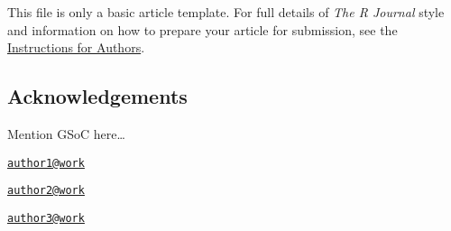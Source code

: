 This file is only a basic article template. For full details of
\emph{The R Journal} style and information on how to prepare your
article for submission, see the
\href{https://journal.r-project.org/share/author-guide.pdf}{Instructions
for Authors}. 

\subsection{Acknowledgements}\label{acknowledgements}

Mention GSoC here\ldots{}

\address{%
Author One\\
Affiliation\\
line 1\\ line 2\\
}
\href{mailto:author1@work}{\nolinkurl{author1@work}}

\address{%
Author Two\\
Affiliation\\
line 1\\ line 2\\
}
\href{mailto:author2@work}{\nolinkurl{author2@work}}

\address{%
Author Three\\
Affiliation\\
line 1\\ line 2\\
}
\href{mailto:author3@work}{\nolinkurl{author3@work}}

